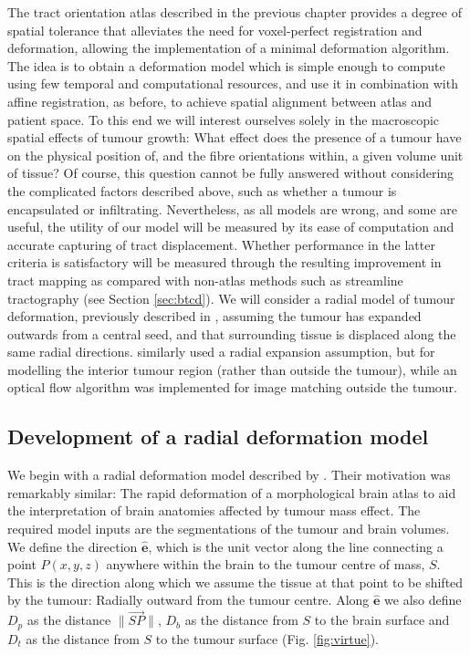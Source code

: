 The tract orientation atlas described in the previous chapter provides a degree of spatial tolerance that alleviates the need for voxel-perfect registration and deformation, allowing the implementation of a minimal deformation algorithm.
The idea is to obtain a deformation model which is simple enough to compute using few temporal and computational resources, and use it in combination with affine registration, as before, to achieve spatial alignment between atlas and patient space.
To this end we will interest ourselves solely in the macroscopic spatial effects of tumour growth:
What effect does the presence of a tumour have on the physical position of, and the fibre orientations within, a given volume unit of tissue?
Of course, this question cannot be fully answered without considering the complicated factors described above, such as whether a tumour is encapsulated or infiltrating.
Nevertheless, as all models are wrong, and some are useful, the utility of our model will be measured by its ease of computation and accurate capturing of tract displacement.
Whether performance in the latter criteria is satisfactory will be measured through the resulting improvement in tract mapping as compared with non-atlas methods such as streamline tractography (see Section \ref{sec:btcd}).
We will consider a radial model of tumour deformation, previously described in \textcite{Young2022}, assuming the tumour has expanded outwards from a central seed, and that surrounding tissue is displaced along the same radial directions.
\textcite{Cuadra2004} similarly used a radial expansion assumption, but for modelling the interior tumour region (rather than outside the tumour), while an optical flow algorithm was implemented for image matching outside the tumour.

\subsection{Development of a radial deformation model}

We begin with a radial deformation model described by \textcite{Nowinski2005}.
Their motivation was remarkably similar:
The rapid deformation of a morphological brain atlas to aid the interpretation of brain anatomies affected by tumour mass effect.
The required model inputs are the segmentations of the tumour and brain volumes.
We define the direction $\mathbf{\hat{e}}$, which is the unit vector along the line connecting a point $P(x,y,z)$ anywhere within the brain to the tumour centre of mass, $S$.
This is the direction along which we assume the tissue at that point to be shifted by the tumour:
Radially outward from the tumour centre.
Along $\mathbf{\hat{e}}$ we also define $D_p$ as the distance  $\|\overrightarrow{SP}\|$, $D_b$ as the distance from $S$ to the brain surface and $D_t$ as the distance from $S$ to the tumour surface (Fig. \ref{fig:virtue}).

